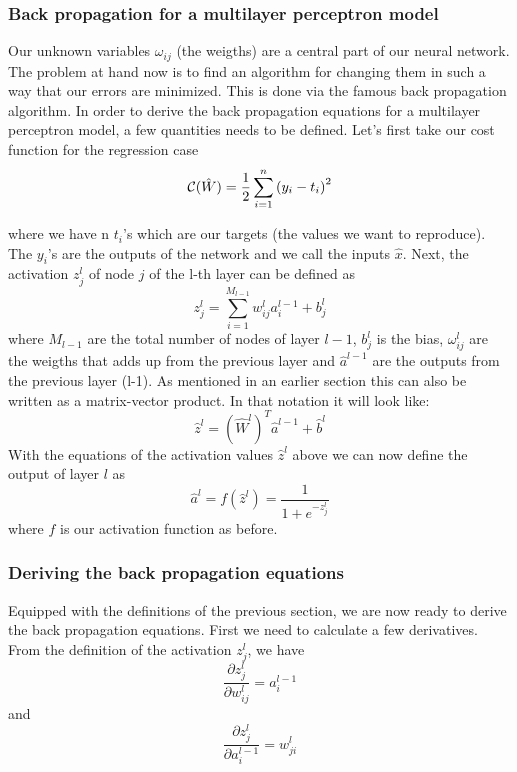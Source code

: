 \documentclass[a4paper,12pt]{article}
\begin{document}
\subsubsection{Back propagation for a multilayer perceptron model}
Our unknown variables $\omega_{ij}$ (the weigths) are a central part of our neural network. The problem at hand now is to find an algorithm for changing them in such a way that our errors are minimized. This is done via the famous back propagation algorithm.\newline 
In order to derive the back propagation equations for a multilayer perceptron model, a few quantities needs to be defined. Let's first take our cost function for the regression case 
\begin{equation}
   {\cal C}(\hat{W})  =  \frac{1}{2}\sum_{i=1}^n\left(y_i - t_i\right)^2 
\end{equation}

where we have n $t_i$'s which are our targets (the values we want to reproduce). The $y_i$'s are the outputs of the network and we call the inputs $\hat{x}$.\newline
Next, the activation $z_j^l$ of node $j$ of the l-th layer can be defined as
\begin{equation}
    z_j^l = \sum_{i=1}^{M_{l-1}}w_{ij}^la_i^{l-1}+b_j^l
\end{equation}
where $M_{l-1}$ are the total number of nodes of layer $l-1$, $b_j^l$ is the bias, $\omega_{ij}^l$ are the weigths that adds up from the previous layer and $\hat{a}^{l-1}$ are the outputs from the previous layer (l-1). As mentioned in an earlier section this can also be written as a matrix-vector product. In that notation it will look like:
\begin{equation}
    \hat{z}^l = \left(\hat{W}^l\right)^T\hat{a}^{l-1}+\hat{b}^l
\end{equation}
With the equations of the activation values $\hat{z}^l$ above we can now define the output of layer $l$ as
\begin{equation}
    \hat{a}^l = f(\hat{z}^l) = \frac{1}{1 + e^{-z_j^l}}
\end{equation}
where $f$ is our activation function as before.\newline

\subsubsection{Deriving the back propagation equations}
Equipped with the definitions of the previous section, we are now ready to derive the back propagation equations. First we need to calculate a few derivatives.\newline
From the definition of the activation $z_j^l$, we have
\begin{equation}
    \frac{\partial z_j^l}{\partial w_{ij}^l} = a_i^{l-1}
\end{equation}
and
\begin{equation}
    \frac{\partial z_j^l}{\partial a_i^{l-1}} = w_{ji}^l
\end{equation}
\end{document}
